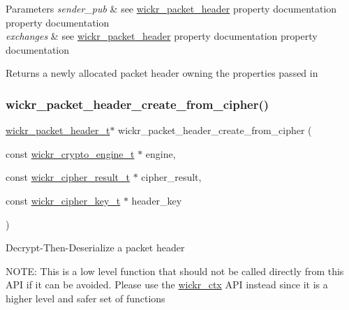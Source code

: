 \begin{DoxyParams}{Parameters}
{\em sender\+\_\+pub} & see \textquotesingle{}\hyperlink{structwickr__packet__header}{wickr\+\_\+packet\+\_\+header}\textquotesingle{} property documentation property documentation \\
\hline
{\em exchanges} & see \textquotesingle{}\hyperlink{structwickr__packet__header}{wickr\+\_\+packet\+\_\+header}\textquotesingle{} property documentation property documentation \\
\hline
\end{DoxyParams}
\begin{DoxyReturn}{Returns}
a newly allocated packet header owning the properties passed in 
\end{DoxyReturn}
\mbox{\label{group__wickr__protocol_ga53ff33471ac0c4c7e3feedfcce520639}} 
\subsubsection{\texorpdfstring{wickr\+\_\+packet\+\_\+header\+\_\+create\+\_\+from\+\_\+cipher()}{wickr\_packet\_header\_create\_from\_cipher()}}
{\footnotesize\ttfamily \hyperlink{structwickr__packet__header}{wickr\+\_\+packet\+\_\+header\+\_\+t}$\ast$ wickr\+\_\+packet\+\_\+header\+\_\+create\+\_\+from\+\_\+cipher (\begin{DoxyParamCaption}\item[{const \hyperlink{structwickr__crypto__engine}{wickr\+\_\+crypto\+\_\+engine\+\_\+t} $\ast$}]{engine,  }\item[{const \hyperlink{structwickr__cipher__result}{wickr\+\_\+cipher\+\_\+result\+\_\+t} $\ast$}]{cipher\+\_\+result,  }\item[{const \hyperlink{structwickr__cipher__key}{wickr\+\_\+cipher\+\_\+key\+\_\+t} $\ast$}]{header\+\_\+key }\end{DoxyParamCaption})}

Decrypt-\/\+Then-\/\+Deserialize a packet header

N\+O\+TE\+: This is a low level function that should not be called directly from this A\+PI if it can be avoided. Please use the \textquotesingle{}\hyperlink{structwickr__ctx}{wickr\+\_\+ctx}\textquotesingle{} A\+PI instead since it is a higher level and safer set of functions


